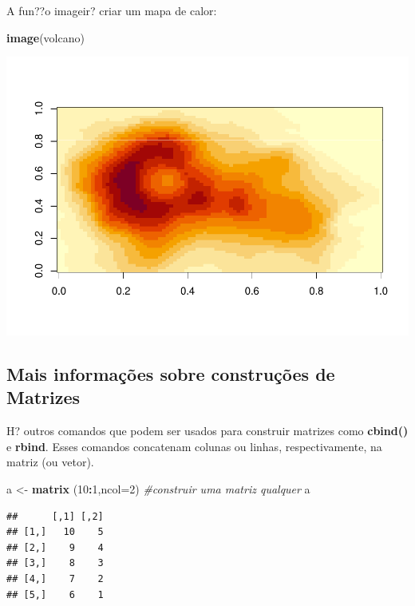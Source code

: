 \documentclass[]{book}
\newenvironment{Shaded}{\begin{snugshade}}{\end{snugshade}}
\newcommand{\CommentTok}[1]{\textcolor[rgb]{0.56,0.35,0.01}{\textit{#1}}}
\newcommand{\DataTypeTok}[1]{\textcolor[rgb]{0.13,0.29,0.53}{#1}}
\newcommand{\DecValTok}[1]{\textcolor[rgb]{0.00,0.00,0.81}{#1}}
\newcommand{\KeywordTok}[1]{\textcolor[rgb]{0.13,0.29,0.53}{\textbf{#1}}}
\newcommand{\NormalTok}[1]{#1}
\newcommand{\OperatorTok}[1]{\textcolor[rgb]{0.81,0.36,0.00}{\textbf{#1}}}
\newcommand{\StringTok}[1]{\textcolor[rgb]{0.31,0.60,0.02}{#1}}
\begin{document}
A fun??o imageir? criar um mapa de calor:

\begin{Shaded}
\begin{Highlighting}[]
\KeywordTok{image}\NormalTok{(volcano)}
\end{Highlighting}
\end{Shaded}

\includegraphics{TudodoR_files/figure-latex/unnamed-chunk-76-1.pdf}

\hypertarget{mais-informacoes-sobre-construcoes-de-matrizes}{%
\subsection{Mais informações sobre construções de Matrizes}\label{mais-informacoes-sobre-construcoes-de-matrizes}}

H? outros comandos que podem ser usados para construir matrizes como \textbf{cbind()} e \textbf{rbind}. Esses comandos concatenam colunas ou linhas, respectivamente, na matriz (ou vetor).

\begin{Shaded}
\begin{Highlighting}[]
\NormalTok{a <-}\StringTok{ }\KeywordTok{matrix}\NormalTok{ (}\DecValTok{10}\OperatorTok{:}\DecValTok{1}\NormalTok{,}\DataTypeTok{ncol=}\DecValTok{2}\NormalTok{) }\CommentTok{#construir uma matriz qualquer}
\NormalTok{a}
\end{Highlighting}
\end{Shaded}

\begin{verbatim}
##      [,1] [,2]
## [1,]   10    5
## [2,]    9    4
## [3,]    8    3
## [4,]    7    2
## [5,]    6    1
\end{verbatim}
\end{document}
